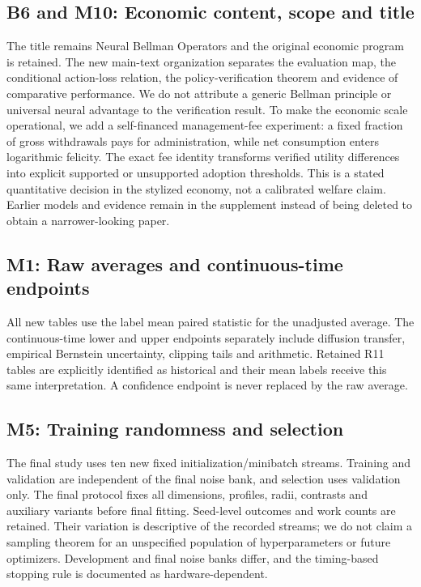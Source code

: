 \subsection*{B6 and M10: Economic content, scope and title}
The title remains Neural Bellman Operators and the original economic program is retained. The new main-text organization separates the evaluation map, the conditional action-loss relation, the policy-verification theorem and evidence of comparative performance. We do not attribute a generic Bellman principle or universal neural advantage to the verification result. To make the economic scale operational, we add a self-financed management-fee experiment: a fixed fraction of gross withdrawals pays for administration, while net consumption enters logarithmic felicity. The exact fee identity transforms verified utility differences into explicit supported or unsupported adoption thresholds. This is a stated quantitative decision in the stylized economy, not a calibrated welfare claim. Earlier models and evidence remain in the supplement instead of being deleted to obtain a narrower-looking paper.

\subsection*{M1: Raw averages and continuous-time endpoints}
All new tables use the label mean paired statistic for the unadjusted average. The continuous-time lower and upper endpoints separately include diffusion transfer, empirical Bernstein uncertainty, clipping tails and arithmetic. Retained R11 tables are explicitly identified as historical and their mean labels receive this same interpretation. A confidence endpoint is never replaced by the raw average.

\subsection*{M5: Training randomness and selection}
The final study uses ten new fixed initialization/minibatch streams. Training and validation are independent of the final noise bank, and selection uses validation only. The final protocol fixes all dimensions, profiles, radii, contrasts and auxiliary variants before final fitting. Seed-level outcomes and work counts are retained. Their variation is descriptive of the recorded streams; we do not claim a sampling theorem for an unspecified population of hyperparameters or future optimizers. Development and final noise banks differ, and the timing-based stopping rule is documented as hardware-dependent.

